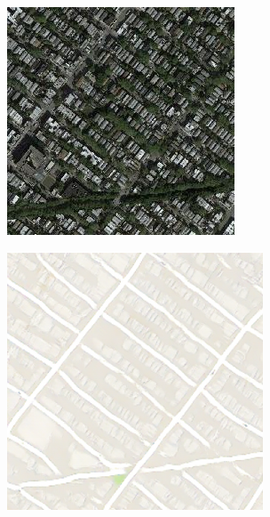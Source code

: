 \begin{figure}
	\medskip

	\begin{subfigure}[t]{.2\textwidth}
		\centering
		\includegraphics[width=\linewidth]{images/Vergleich/Satelite12.jpg}
	  \end{subfigure}
	  \begin{subfigure}[t]{.2\textwidth}
		\centering
		\includegraphics[width=\linewidth]{images/Vergleich/p4.png}

\end{subfigure}
\end{figure}
